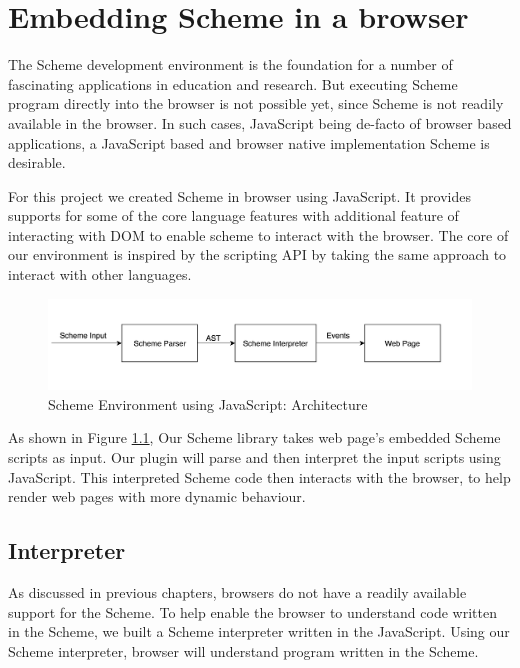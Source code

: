 \chapter{Embedding Scheme in a browser} \label{scheme}

The Scheme development environment is the foundation for a number of fascinating applications in education and research. But executing Scheme program directly into the browser is not possible yet, since Scheme is not readily available in the browser. In such cases, JavaScript being de-facto of browser based applications, a JavaScript based and browser native implementation Scheme is desirable.

For this project we created Scheme in browser using JavaScript. It provides supports for some of the core language features with additional feature of interacting with DOM to enable scheme to interact with the browser.  The core of our environment is inspired by the scripting API \cite{javascripting} by taking the same approach to interact with other languages. 

\begin{figure}[ht]
	\begin{center}
		\includegraphics[width=\linewidth]{./images/SchemeEnvironmentusingJavaScript.png}
	\end{center}
	\caption{Scheme Environment using JavaScript: Architecture}
	\label{fig:SchemeEnvironmentusingJavaScript}
\end{figure}


As shown in Figure \ref{fig:SchemeEnvironmentusingJavaScript}, Our Scheme library takes web page's embedded Scheme scripts as input. Our plugin will parse and then interpret the input scripts using JavaScript. This interpreted Scheme code then interacts with the browser, to help render web pages with more dynamic behaviour. 

\section{Interpreter} 
As discussed in previous chapters, browsers do not have a readily available support for the Scheme. To help enable the browser to understand code written in the Scheme, we built a Scheme interpreter written in the JavaScript. Using our Scheme interpreter, browser will understand program written in the Scheme.

